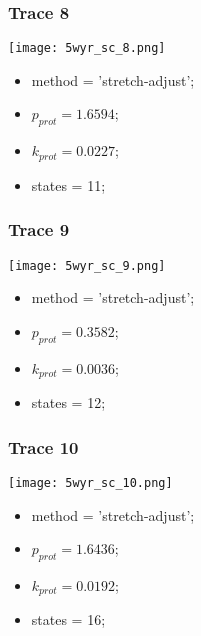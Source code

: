 \subsubsection{Trace 8}
\begin{minipage}[c]{0.7\textwidth}
    \texttt{[image: 5wyr\_sc\_8.png]}
\end{minipage}
\hfill
\begin{minipage}[c]{0.45\textwidth}
    \begin{itemize}
        \item method = 'stretch-adjust';
        \item $p_{prot}=1.6594$;
        \item $k_{prot}=0.0227$;
        \item states = 11;
    \end{itemize}
\end{minipage}

\subsubsection{Trace 9}
\begin{minipage}[c]{0.7\textwidth}
    \texttt{[image: 5wyr\_sc\_9.png]}
\end{minipage}
\hfill
\begin{minipage}[c]{0.45\textwidth}
    \begin{itemize}
        \item method = 'stretch-adjust';
        \item $p_{prot}=0.3582$;
        \item $k_{prot}=0.0036$;
        \item states = 12;
    \end{itemize}
\end{minipage}

\subsubsection{Trace 10}
\begin{minipage}[c]{0.7\textwidth}
    \texttt{[image: 5wyr\_sc\_10.png]}
\end{minipage}
\hfill
\begin{minipage}[c]{0.45\textwidth}
    \begin{itemize}
        \item method = 'stretch-adjust';
        \item $p_{prot}=1.6436$;
        \item $k_{prot}=0.0192$;
        \item states = 16;
    \end{itemize}
\end{minipage}


